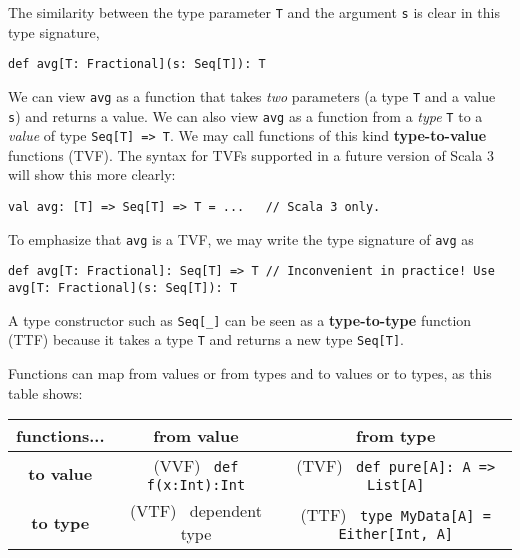 The similarity between the type parameter \lstinline!T! and the argument
\lstinline!s! is clear in this type signature,
\begin{lstlisting}
def avg[T: Fractional](s: Seq[T]): T
\end{lstlisting}
\begin{comment}
def avg{[}T: Fractional{]}(s : Seq{[}T{]}): T = \{

val frac = implicitly{[}Fractional{[}T{]}{]}

frac.div(s.sum, frac.fromInt(s.length)) 

\}
\end{comment}
We can view \lstinline!avg! as a function that takes \emph{two} parameters
(a type \lstinline!T! and a value \lstinline!s!) and returns a value.
We can also view \lstinline!avg! as a function from a \emph{type}
\lstinline!T! to a \emph{value} of type \lstinline!Seq[T] => T!.
We may call functions of this kind \textbf{type-to-value}
functions (TVF). The syntax for TVFs supported in a future version
of Scala 3 will show this more clearly:
\begin{lstlisting}
val avg: [T] => Seq[T] => T = ...   // Scala 3 only.
\end{lstlisting}
To emphasize that \lstinline!avg! is a TVF, we may write the type
signature of \lstinline!avg! as
\begin{lstlisting}
def avg[T: Fractional]: Seq[T] => T // Inconvenient in practice! Use avg[T: Fractional](s: Seq[T]): T
\end{lstlisting}

A type constructor such as \lstinline!Seq[_]! can be seen as a \textbf{type-to-type}
function (TTF) because it takes a type \lstinline!T! and returns
a new type \lstinline!Seq[T]!.

Functions can map from values or from types and to values or to types,
as this table shows:
\begin{center}
\begin{tabular}{|c|c|c|}
\hline 
\textbf{\small{}functions...} & \textbf{\small{}from value} & \textbf{\small{}from type}\tabularnewline
\hline 
\hline 
\textbf{\small{}to value} & {\small{}(VVF)~ }\lstinline!def f(x:Int):Int! & {\small{}(TVF)~ }\lstinline!def pure[A]: A => List[A]!\tabularnewline
\hline 
\textbf{\small{}to type} & {\small{}(VTF)~ dependent type} & {\small{}(TTF)~ }\lstinline!type MyData[A] = Either[Int, A]!\tabularnewline
\hline 
\end{tabular}
\par\end{center}

